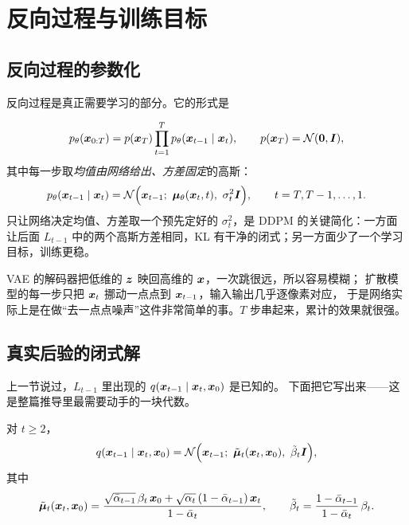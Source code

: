 \section{反向过程与训练目标}

\subsection{反向过程的参数化}

反向过程是真正需要学习的部分。它的形式是

\begin{equation}
  p_\theta(\bm{x}_{0:T})=p(\bm{x}_T)\prod_{t=1}^{T}p_\theta(\bm{x}_{t-1}\mid\bm{x}_t),
  \qquad
  p(\bm{x}_T)=\mathcal{N}(\bm{0},\bm{I}),
  \label{eq:reverse-chain}
\end{equation}
其中每一步取\emph{均值由网络给出、方差固定}的高斯：
\begin{equation}
  p_\theta(\bm{x}_{t-1}\mid\bm{x}_t)
  = \mathcal{N}\Bigl(\bm{x}_{t-1};\ \bm{\mu}_\theta(\bm{x}_t,t),\ \sigma_t^2\bm{I}\Bigr),
  \qquad t=T,T-1,\dots,1 .
  \label{eq:reverse-step}
\end{equation}
只让网络决定均值、方差取一个预先定好的 $\sigma_t^2$，是 DDPM 的关键简化：一方面让后面
$L_{t-1}$ 中的两个高斯方差相同，KL 有干净的闭式；另一方面少了一个学习目标，训练更稳。

\begin{remark}
VAE 的解码器把低维的 $\bm{z}$ 映回高维的 $\bm{x}$，一次跳很远，所以容易模糊；
扩散模型的每一步只把 $\bm{x}_t$ 挪动一点点到 $\bm{x}_{t-1}$，输入输出几乎逐像素对应，
于是网络实际上是在做“去一点点噪声”这件非常简单的事。$T$ 步串起来，累计的效果就很强。
\end{remark}

\subsection{真实后验的闭式解}

上一节说过，$L_{t-1}$ 里出现的 $q(\bm{x}_{t-1}\mid\bm{x}_t,\bm{x}_0)$ 是已知的。
下面把它写出来——这是整篇推导里最需要动手的一块代数。

\begin{proposition}[前向过程的后验]
\label{prop:posterior}
对 $t\ge 2$，
\begin{equation}
  q(\bx_{t-1}\mid\bx_t,\bx_0)
  = \Ncal\Bigl(\bx_{t-1};\ \tilde{\bmu}_t(\bx_t,\bx_0),\ \tilde\beta_t\bI\Bigr),
  \label{eq:posterior}
\end{equation}
其中
\begin{equation}
  \tilde{\bm{\mu}}_t(\bm{x}_t,\bm{x}_0)
  = \frac{\sqrt{\bar\alpha_{t-1}}\,\beta_t\,\bm{x}_0+\sqrt{\alpha_t}\,(1-\bar\alpha_{t-1})\,\bm{x}_t}{1-\bar{\alpha}_t},
  \qquad
  \tilde\beta_t=\frac{1-\bar\alpha_{t-1}}{1-\bar{\alpha}_t}\,\beta_t .
  \label{eq:posterior-mean-var}
\end{equation}
\end{proposition}

